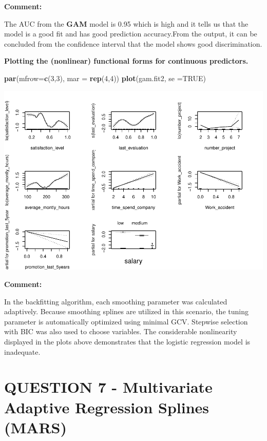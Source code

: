 \documentclass[
  11pt,
]{article}
\newenvironment{Shaded}{\begin{snugshade}}{\end{snugshade}}
\newcommand{\AttributeTok}[1]{\textcolor[rgb]{0.13,0.29,0.53}{#1}}
\newcommand{\ConstantTok}[1]{\textcolor[rgb]{0.56,0.35,0.01}{#1}}
\newcommand{\DecValTok}[1]{\textcolor[rgb]{0.00,0.00,0.81}{#1}}
\newcommand{\FunctionTok}[1]{\textcolor[rgb]{0.13,0.29,0.53}{\textbf{#1}}}
\newcommand{\NormalTok}[1]{#1}
\begin{document}
\hfill\break
\textbf{Comment:}

The AUC from the \textbf{GAM} model is 0.95 which is high and it tells
us that the model is a good fit and has good prediction accuracy.From
the output, it can be concluded from the confidence interval that the
model shows good discrimination.

\textbf{Plotting the (nonlinear) functional forms for continuous
predictors.}

\begin{Shaded}
\begin{Highlighting}[]
\FunctionTok{par}\NormalTok{(}\AttributeTok{mfrow=}\FunctionTok{c}\NormalTok{(}\DecValTok{3}\NormalTok{,}\DecValTok{3}\NormalTok{), }\AttributeTok{mar =} \FunctionTok{rep}\NormalTok{(}\DecValTok{4}\NormalTok{,}\DecValTok{4}\NormalTok{))}
\FunctionTok{plot}\NormalTok{(gam.fit2, }\AttributeTok{se =}\ConstantTok{TRUE}\NormalTok{)}
\end{Highlighting}
\end{Shaded}

\includegraphics[width=0.9\linewidth]{OWUSU_project_files/figure-latex/unnamed-chunk-37-1}

\textbf{Comment:}

In the backfitting algorithm, each smoothing parameter was calculated
adaptively. Because smoothing splines are utilized in this scenario, the
tuning parameter is automatically optimized using minimal GCV. Stepwise
selection with BIC was also used to choose variables. The considerable
nonlinearity displayed in the plots above demonstrates that the logistic
regression model is inadequate.

\newpage

\section{QUESTION 7 - Multivariate Adaptive Regression Splines (MARS)}
\end{document}
